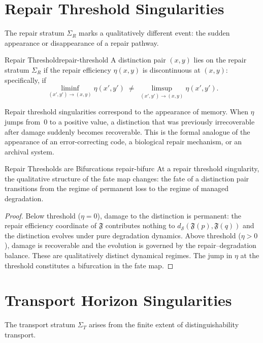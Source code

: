 \documentclass[12pt,twoside,openright]{book}
\newcommand{\fateMap}{\mathfrak{F}}
\newcommand{\fateSpace}{\mathcal{S}}
\newcommand{\repEff}{\eta}               %
\newcommand{\fateDist}[2]{d_{\fateSpace}(#1,#2)}
\newcommand{\strataR}{\Sigma_{R}}   %
\newcommand{\strataT}{\Sigma_{T}}   %
\providecommand{\strataR}{\Sigma_{R}}
\providecommand{\strataT}{\Sigma_{T}}
\providecommand{\fateDist}[2]{d_{\fateSpace}(#1,#2)}
\begin{document}
\section{Repair Threshold Singularities}

The repair stratum $\strataR$ marks a qualitatively different
event: the sudden appearance or disappearance of a repair
pathway.

\begin{definition}{Repair Threshold}{repair-threshold}
A distinction pair $(x,y)$ lies on the repair stratum $\strataR$
if the repair efficiency $\repEff(x,y)$ is discontinuous at
$(x,y)$: specifically, if
\[
  \liminf_{(x',y')\to(x,y)}\repEff(x',y')
  \;\neq\;
  \limsup_{(x',y')\to(x,y)}\repEff(x',y').
\]
\end{definition}

Repair threshold singularities correspond to the appearance of
memory. When $\repEff$ jumps from~$0$ to a positive value, a
distinction that was previously irrecoverable after damage
suddenly becomes recoverable. This is the formal analogue of
the appearance of an error-correcting code, a biological repair
mechanism, or an archival system.

\begin{proposition}{Repair Thresholds are Bifurcations}%
  {repair-bifurc}
At a repair threshold singularity, the qualitative structure of
the fate map changes: the fate of a distinction pair transitions
from the regime of permanent loss to the regime of managed
degradation.
\begin{proof}
Below threshold ($\repEff=0$), damage to the distinction is
permanent: the repair efficiency coordinate of $\fateMap$
contributes nothing to $\fateDist{\fateMap(p)}{\fateMap(q)}$
and the distinction evolves under pure degradation dynamics.
Above threshold ($\repEff>0$), damage is recoverable and the
evolution is governed by the repair--degradation balance.
These are qualitatively distinct dynamical regimes. The jump
in $\repEff$ at the threshold constitutes a bifurcation in the
fate map.
\end{proof}
\end{proposition}

\section{Transport Horizon Singularities}

The transport stratum $\strataT$ arises from the finite extent
of distinguishability transport.
\end{document}

